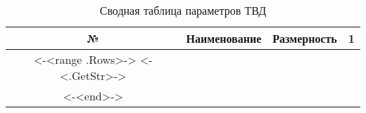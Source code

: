 \begin{center}
    \begin{longtable}{|c|c|c|c|}
        \hline
        \textbf{№} &
        \textbf{Наименование} &
        \textbf{Размерность} &
        \textbf{1} \\\hline
        \endhead
        <-<range .Rows>->
        <-<.GetStr>-> \\\hline
        <-<end>->
        \caption{Сводная таблица параметров ТВД} \label{tab:hpt-stage-total}
    \end{longtable}
\end{center}